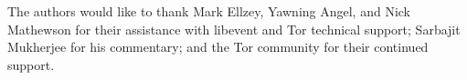 
\begin{dedication}

The authors would like to thank Mark Ellzey, Yawning Angel, and Nick Mathewson for their assistance with libevent and Tor technical support; Sarbajit Mukherjee for his commentary; and the Tor community for their continued support.

\end{dedication}